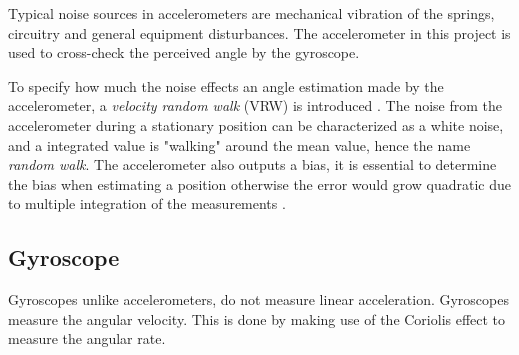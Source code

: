 \documentclass[a4paper,11pt]{kth-mag}
\begin{document}
Typical noise sources in accelerometers are mechanical vibration of the springs, circuitry and general equipment disturbances. The accelerometer in this project is used to cross-check the perceived angle by the gyroscope.

To specify how much the noise effects an angle estimation made by the accelerometer, a \textit{velocity random walk} (VRW) is introduced\cite{ARW} . The noise from the accelerometer during a stationary position can be characterized as a white noise, and a integrated value is "walking" around the mean value, hence the name \textit{random walk}.
The accelerometer also outputs a bias, it is essential to determine the bias when estimating a position otherwise the error would grow quadratic due to multiple integration of the measurements \cite{ref:accelerometero}.

\subsection{Gyroscope} \label{gyroscope}
Gyroscopes unlike accelerometers, do not measure linear acceleration. Gyroscopes measure the angular velocity. This is done by making use of the Coriolis effect to measure the angular rate.
\end{document}
